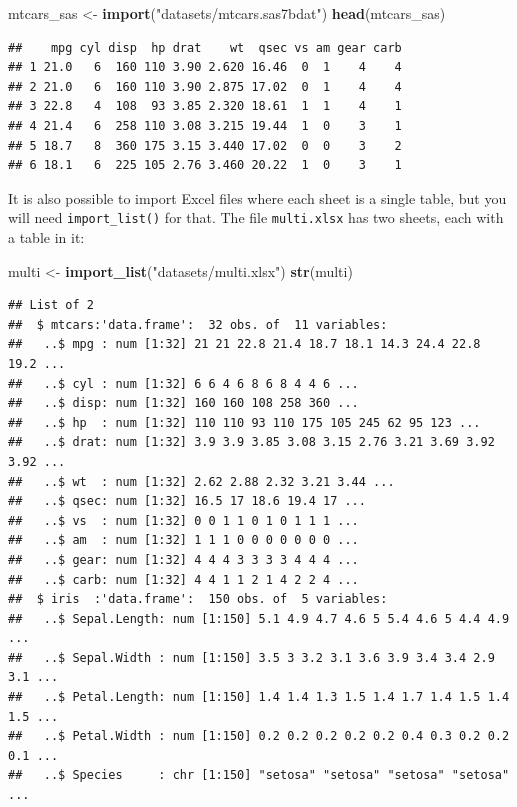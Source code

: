 \documentclass[]{gitbook}
\newenvironment{Shaded}{\begin{snugshade}}{\end{snugshade}}
\newcommand{\KeywordTok}[1]{\textcolor[rgb]{0.13,0.29,0.53}{\textbf{#1}}}
\newcommand{\NormalTok}[1]{#1}
\newcommand{\StringTok}[1]{\textcolor[rgb]{0.31,0.60,0.02}{#1}}
\begin{document}
\begin{Shaded}
\begin{Highlighting}[]
\NormalTok{mtcars_sas <-}\StringTok{ }\KeywordTok{import}\NormalTok{(}\StringTok{"datasets/mtcars.sas7bdat"}\NormalTok{)}
\KeywordTok{head}\NormalTok{(mtcars_sas)}
\end{Highlighting}
\end{Shaded}

\begin{verbatim}
##    mpg cyl disp  hp drat    wt  qsec vs am gear carb
## 1 21.0   6  160 110 3.90 2.620 16.46  0  1    4    4
## 2 21.0   6  160 110 3.90 2.875 17.02  0  1    4    4
## 3 22.8   4  108  93 3.85 2.320 18.61  1  1    4    1
## 4 21.4   6  258 110 3.08 3.215 19.44  1  0    3    1
## 5 18.7   8  360 175 3.15 3.440 17.02  0  0    3    2
## 6 18.1   6  225 105 2.76 3.460 20.22  1  0    3    1
\end{verbatim}

It is also possible to import Excel files where each sheet is a single table, but you will need
\texttt{import\_list()} for that. The file \texttt{multi.xlsx} has two sheets, each with a table in it:

\begin{Shaded}
\begin{Highlighting}[]
\NormalTok{multi <-}\StringTok{ }\KeywordTok{import_list}\NormalTok{(}\StringTok{"datasets/multi.xlsx"}\NormalTok{)}
\KeywordTok{str}\NormalTok{(multi)}
\end{Highlighting}
\end{Shaded}

\begin{verbatim}
## List of 2
##  $ mtcars:'data.frame':  32 obs. of  11 variables:
##   ..$ mpg : num [1:32] 21 21 22.8 21.4 18.7 18.1 14.3 24.4 22.8 19.2 ...
##   ..$ cyl : num [1:32] 6 6 4 6 8 6 8 4 4 6 ...
##   ..$ disp: num [1:32] 160 160 108 258 360 ...
##   ..$ hp  : num [1:32] 110 110 93 110 175 105 245 62 95 123 ...
##   ..$ drat: num [1:32] 3.9 3.9 3.85 3.08 3.15 2.76 3.21 3.69 3.92 3.92 ...
##   ..$ wt  : num [1:32] 2.62 2.88 2.32 3.21 3.44 ...
##   ..$ qsec: num [1:32] 16.5 17 18.6 19.4 17 ...
##   ..$ vs  : num [1:32] 0 0 1 1 0 1 0 1 1 1 ...
##   ..$ am  : num [1:32] 1 1 1 0 0 0 0 0 0 0 ...
##   ..$ gear: num [1:32] 4 4 4 3 3 3 3 4 4 4 ...
##   ..$ carb: num [1:32] 4 4 1 1 2 1 4 2 2 4 ...
##  $ iris  :'data.frame':  150 obs. of  5 variables:
##   ..$ Sepal.Length: num [1:150] 5.1 4.9 4.7 4.6 5 5.4 4.6 5 4.4 4.9 ...
##   ..$ Sepal.Width : num [1:150] 3.5 3 3.2 3.1 3.6 3.9 3.4 3.4 2.9 3.1 ...
##   ..$ Petal.Length: num [1:150] 1.4 1.4 1.3 1.5 1.4 1.7 1.4 1.5 1.4 1.5 ...
##   ..$ Petal.Width : num [1:150] 0.2 0.2 0.2 0.2 0.2 0.4 0.3 0.2 0.2 0.1 ...
##   ..$ Species     : chr [1:150] "setosa" "setosa" "setosa" "setosa" ...
\end{verbatim}
\end{document}
